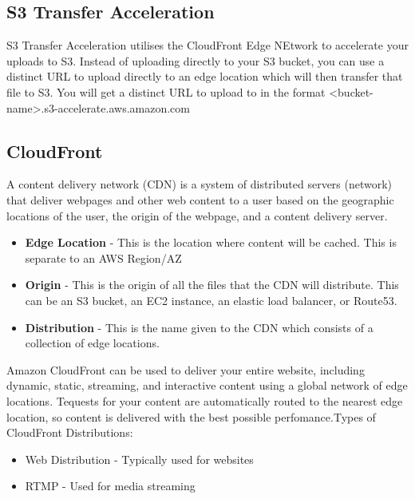 \documentclass{article}
\begin{document}
	\subsection{S3 Transfer Acceleration}
	S3 Transfer Acceleration utilises the CloudFront Edge NEtwork to accelerate your uploads to S3. Instead of uploading directly to your S3 bucket, you can use a distinct URL to upload directly to an edge location which will then transfer that file to S3. You will get a distinct URL to upload to in the format <bucket-name>.s3-accelerate.aws.amazon.com
	
	\subsection{CloudFront}
	A content delivery network (CDN) is a system of distributed servers (network) that deliver webpages and other web content to a user based on the geographic locations of the user, the origin of the webpage, and a content delivery server.
	
	\begin{itemize}
	\item
	\textbf{Edge Location} - This is the location where content will be cached. This is separate to an AWS Region/AZ
	
	\item
	\textbf{Origin} - This is the origin of all the files that the CDN will distribute. This can be an S3 bucket, an EC2 instance, an elastic load balancer, or Route53.
	
	\item
	\textbf{Distribution} - This is the name given to the CDN which consists of a collection of edge locations.
	\end{itemize}
	
	Amazon CloudFront can be used to deliver your entire website, including dynamic, static, streaming, and interactive content using a global network of edge locations. Tequests for your content are automatically routed to the nearest edge location, so content is delivered with the best possible perfomance.Types of CloudFront Distributions: 
	\begin{itemize}
	\item
	Web Distribution - Typically used for websites
	
	\item
	RTMP - Used for media streaming
	\end{itemize}
	
\end{document}
